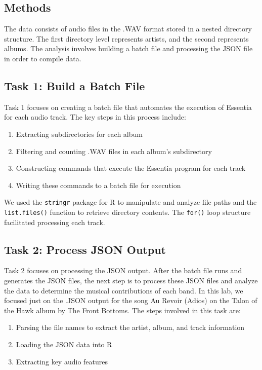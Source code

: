 \documentclass{article}\usepackage[]{graphicx}\usepackage[]{xcolor}
\begin{document}
\begin{multicols}{2}
\section{Methods}
The data consists of audio files in the .WAV format stored in a nested directory structure. The first directory level represents artists, and the second represents albums. The analysis involves building a batch file and processing the JSON file in order to compile data.
\columnbreak
\subsection{Task 1: Build a Batch File}
Task 1 focuses on creating a batch file that automates the execution of Essentia for each audio track. The key steps in this process include:

\begin{enumerate} 
  \item Extracting subdirectories for each album
  \item Filtering and counting .WAV files in each album's subdirectory
  \item Constructing commands that execute the Essentia program for each track
  \item Writing these commands to a batch file for execution
\end{enumerate}

We used the \texttt{stringr} package for R \citep{stringr} to manipulate and analyze file paths and the \texttt{list.files()} function to retrieve directory contents. The \texttt{for()} loop structure facilitated processing each track.

\subsection{Task 2: Process JSON Output}
Task 2 focuses on processing the JSON output. After the batch file runs and generates the JSON files, the next step is to process these JSON files and analyze the data to determine the musical contributions of each band. In this lab, we focused just on the .JSON output for the song Au Revoir (Adios) on the Talon of the Hawk album by The Front Bottoms. The steps involved in this task are:

\begin{enumerate} 
  \item Parsing the file names to extract the artist, album, and track information 
  \item Loading the JSON data into R
  \item Extracting key audio features
\end{enumerate}


\end{multicols}
\end{document}
